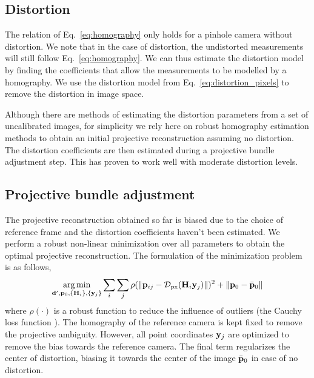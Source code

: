 \documentclass[10pt,twocolumn,letterpaper]{article}
\begin{document}
\subsection{Distortion}
\label{sec:planar:distortion}

The relation of Eq.~\eqref{eq:homography} only holds for a pinhole camera without distortion. We note that in the case of distortion, the undistorted measurements will still follow Eq.~\eqref{eq:homography}. We can thus estimate the distortion model by finding the coefficients that allow the measurements to be modelled by a homography. We use the distortion model from Eq.~\eqref{eq:distortion_pixels} to remove the distortion in image space.

Although there are methods of estimating the distortion parameters from a set of uncalibrated images, for simplicity we rely here on robust homography estimation methods \cite{hartley2003} to obtain an initial projective reconstruction assuming no distortion. The distortion coefficients are then estimated during a projective bundle adjustment step. This has proven to work well with moderate distortion levels.

\subsection{Projective bundle adjustment}
\label{sec:projective:ba}

The projective reconstruction obtained so far is biased due to the choice of reference frame and the distortion coefficients haven't been estimated. We perform a robust non-linear minimization \cite{ceres-solver} over all parameters to obtain the optimal projective reconstruction. The formulation of the minimization problem is as follows, 
%
\begin{align}
\argmin_{\dv',\pv_0,\lbrace \Hm_i \rbrace, \lbrace \yv_j \rbrace} 
%
\sum_i \sum_j \rho(\norm{\pv_{ij} - \Distortion_{\text{px}}(\Hm_i \yv_j)})^2 + \norm{\pv_0 - \bar{\pv}_0}
\end{align}
%
where $\rho(\cdot)$ is a robust function to reduce the influence of outliers (\eg the Cauchy loss function \cite{ceres-solver}). The homography of the reference camera is kept fixed to remove the projective ambiguity. However, all point coordinates $\mathbf{y}_j$ are optimized to remove the bias towards the reference camera. The final term regularizes the center of distortion, biasing it towards the center of the image $\bar{\mathbf{p}}_0$ in case of no distortion.
\end{document}
